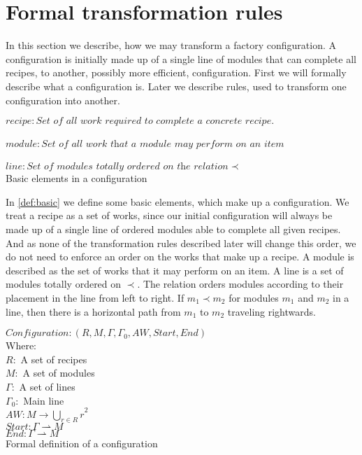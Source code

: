 \section{Formal transformation rules} \label{sec:math_rules}
In this section we describe, how we may transform a factory configuration. A configuration is initially made up of a single line of modules that can complete all recipes, to another, possibly more efficient, configuration. First we will formally describe what a configuration is. Later we describe rules, used to transform one configuration into another.

\begin{definition}[htb]
$recipe: \textit{Set of all work required to complete a concrete recipe.}$
\\ \\
$module: \textit{Set of all work that a module may perform on an item}$
\\ \\
$line: \textit{Set of modules totally ordered on the relation} \prec$
\\
\caption{Basic elements in a configuration}
\label{def:basic}
\end{definition}


In \cref{def:basic} we define some basic elements, which make up a configuration. We treat a recipe as a set of works, since our initial configuration will always be made up of a single line of ordered modules able to complete all given recipes. And as none of the transformation rules described later will change this order, we do not need to enforce an order on the works that make up a recipe. A module is described as the set of works that it may perform on an item. A line is a set of modules totally ordered on $\prec$. The relation orders modules according to their placement in the line from left to right. If $m_1 \prec m_2$ for modules $m_1$ and $m_2$ in a line, then there is a horizontal path from $m_1$ to $m_2$ traveling rightwards. 

\begin{definition}[htb]
$Configuration: (R, M , \Gamma, \Gamma_0, AW, Start, End)$
\\
Where: \\
$R:$ A set of recipes \\
$M:$ A set of modules \\
$\Gamma:$ A set of lines \\
$\Gamma_0:$ Main line \\
$AW: M \rightarrow {\bigcup_{r\in R}r}^2$ \\ 
$Start: \Gamma \rightharpoonup M$ \\
$End: \Gamma \rightharpoonup M$ \\
\caption{Formal definition of a configuration}
\label{def:config}
\end{definition}

